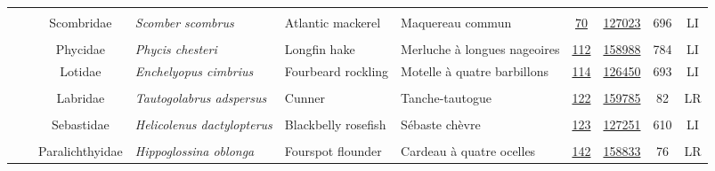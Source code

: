 \documentclass[12pt]{article}\usepackage[]{graphicx}\usepackage[]{color}
\begin{document}
\begin{landscape}
\begin{longtable}[t]{ccc>{\centering\arraybackslash}p{3cm}>{\centering\arraybackslash}p{3cm}>{\centering\arraybackslash}p{3cm}>{}c>{}ccc}
\nopagebreak
\addlinespace[0.3em]
\\
\hspace{1em}\hspace{1em} &  & Scombridae & \em{Scomber scombrus} & Atlantic mackerel & Maquereau commun & \href{#sec:70}{70} & \href{http://www.marinespecies.org/aphia.php?p=taxdetails&id=127023}{127023} & 696 & LI\\
\nopagebreak
\addlinespace[0.3em]
\\
\hspace{1em}\hspace{1em} &  & Phycidae & \em{Phycis chesteri} & Longfin hake & Merluche à longues nageoires & \href{#sec:112}{112} & \href{http://www.marinespecies.org/aphia.php?p=taxdetails&id=158988}{158988} & 784 & LI\\
\nopagebreak
\hspace{1em}\hspace{1em} &  & Lotidae & \em{Enchelyopus cimbrius} & Fourbeard rockling & Motelle à quatre barbillons & \href{#sec:114}{114} & \href{http://www.marinespecies.org/aphia.php?p=taxdetails&id=126450}{126450} & 693 & LI\\
\nopagebreak
\addlinespace[0.3em]
\\
\hspace{1em}\hspace{1em} &  & Labridae & \em{Tautogolabrus adspersus} & Cunner & Tanche-tautogue & \href{#sec:122}{122} & \href{http://www.marinespecies.org/aphia.php?p=taxdetails&id=159785}{159785} & 82 & LR\\
\nopagebreak
\addlinespace[0.3em]
\\
\hspace{1em}\hspace{1em} &  & Sebastidae & \em{Helicolenus dactylopterus} & Blackbelly rosefish & Sébaste chèvre & \href{#sec:123}{123} & \href{http://www.marinespecies.org/aphia.php?p=taxdetails&id=127251}{127251} & 610 & LI\\
\nopagebreak
\addlinespace[0.3em]
\\
\hspace{1em}\hspace{1em} &  & Paralichthyidae & \em{Hippoglossina oblonga} & Fourspot flounder & Cardeau à quatre ocelles & \href{#sec:142}{142} & \href{http://www.marinespecies.org/aphia.php?p=taxdetails&id=158833}{158833} & 76 & LR\\

\end{longtable}
\end{landscape}
\end{document}
